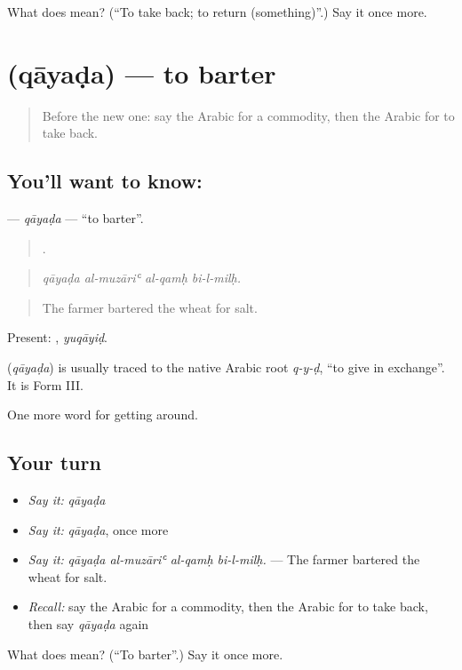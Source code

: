 \begin{tcolorbox}[breakable,colback=teal!4,colframe=teal!35!black,title={Before you move on}]
What does  mean? (\textquotedblleft{}To take back; to return (something)\textquotedblright{}.) Say it once more.
\end{tcolorbox}
\section[\texorpdfstring{\ar{قايض} (qāyaḍa)}{قايض (qāyaḍa)}]{ (qāyaḍa) — to barter}

\label{lesson:AR-C458-qayada}



\begin{quote}
Before the new one: say the Arabic for a commodity, then the Arabic for to take back.
\end{quote}

\subsection*{You'll want to know: }
\textbf{} — \emph{qāyaḍa} — \textquotedblleft{}to barter\textquotedblright{}.

\begin{quote}
   .
\end{quote}

\begin{quote}
\emph{qāyaḍa al-muzāriʿ al-qamḥ bi-l-milḥ.}
\end{quote}

\begin{quote}
The farmer bartered the wheat for salt.
\end{quote}

Present: , \emph{yuqāyiḍ}.

\begin{cousinweb}
\textbf{} (\emph{qāyaḍa}) is usually traced to the native Arabic root \emph{q-y-ḍ}, \textquotedblleft{}to give in exchange\textquotedblright{}. It is Form III.
\end{cousinweb}

\begin{grammarlens}[title={What you've built}]
One more word for getting around.
\end{grammarlens}

\subsection*{Your turn}
\begin{itemize}
\raggedright
  \item \emph{Say it:} \emph{qāyaḍa}
  \item \emph{Say it:} \emph{qāyaḍa}, once more
  \item \emph{Say it:} \emph{qāyaḍa al-muzāriʿ al-qamḥ bi-l-milḥ.} — The farmer bartered the wheat for salt.
  \item \emph{Recall:} say the Arabic for a commodity, then the Arabic for to take back, then say \emph{qāyaḍa} again
\end{itemize}

\begin{tcolorbox}[breakable,colback=teal!4,colframe=teal!35!black,title={Before you move on}]
What does  mean? (\textquotedblleft{}To barter\textquotedblright{}.) Say it once more.
\end{tcolorbox}

